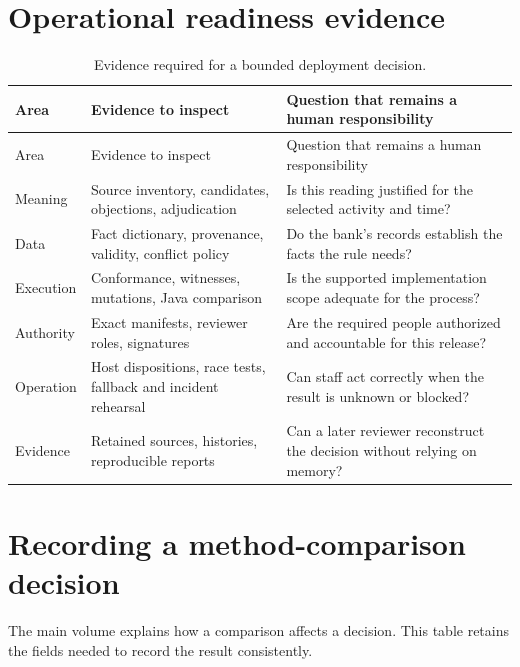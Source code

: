 \section{Operational readiness evidence}
\begin{longtable}{@{}P{31mm}P{60mm}P{57mm}@{}}
\caption{Evidence required for a bounded deployment decision.}\\
\toprule
Area & Evidence to inspect & Question that remains a human responsibility\\\midrule\endfirsthead
\toprule Area & Evidence to inspect & Question that remains a human responsibility\\\midrule\endhead
Meaning & Source inventory, candidates, objections, adjudication & Is this reading justified for the selected activity and time?\\
Data & Fact dictionary, provenance, validity, conflict policy & Do the bank's records establish the facts the rule needs?\\
Execution & Conformance, witnesses, mutations, Java comparison & Is the supported implementation scope adequate for the process?\\
Authority & Exact manifests, reviewer roles, signatures & Are the required people authorized and accountable for this release?\\
Operation & Host dispositions, race tests, fallback and incident rehearsal & Can staff act correctly when the result is unknown or blocked?\\
Evidence & Retained sources, histories, reproducible reports & Can a later reviewer reconstruct the decision without relying on memory?\\
\bottomrule
\end{longtable}

\section{Recording a method-comparison decision}
\label{sec:comparison-decision-record}

The main volume explains how a comparison affects a decision. This table retains
the fields needed to record the result consistently.

